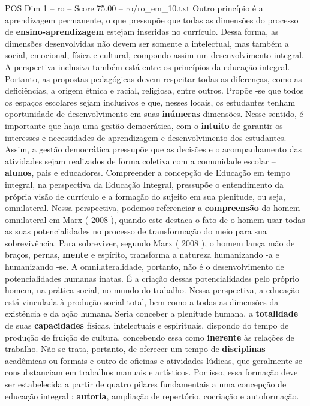 \begin{textsample}{POS Dim 1 – ro – Score 75.00 – ro/ro\_em\_10.txt}
Outro princípio é a aprendizagem permanente, o que pressupõe que todas as dimensões do processo de \textbf{ensino-aprendizagem} estejam inseridas no currículo.
Dessa forma, as dimensões desenvolvidas não devem ser somente a intelectual, mas também a social, emocional, física e cultural, compondo assim um desenvolvimento integral.
A perspectiva inclusiva também está entre os princípios da educação integral.
Portanto, as propostas pedagógicas devem respeitar todas as diferenças, como as deficiências, a origem étnica e racial, religiosa, entre outros.
Propõe -se que todos os espaços escolares sejam inclusivos e que, nesses locais, os estudantes tenham oportunidade de desenvolvimento em suas \textbf{inúmeras} dimensões.
Nesse sentido, é importante que haja uma gestão democrática, com o \textbf{intuito} de garantir os interesses e necessidades de aprendizagem e desenvolvimento dos estudantes.
Assim, a gestão democrática pressupõe que as decisões e o acompanhamento das atividades sejam realizados de forma coletiva com a comunidade escolar – \textbf{alunos}, pais e educadores.
Compreender a concepção de Educação em tempo integral, na perspectiva da Educação Integral, pressupõe o entendimento da própria visão de currículo e a formação do sujeito em sua plenitude, ou seja, omnilateral.
Nessa perspectiva, podemos referenciar a \textbf{compreensão} do homem omnilateral em Marx ( 2008 ), quando este destaca o fato de o homem usar todas as suas potencialidades no processo de transformação do meio para sua sobrevivência.
Para sobreviver, segundo Marx ( 2008 ), o homem lança mão de braços, pernas, \textbf{mente} e espírito, transforma a natureza humanizando -a e humanizando -se.
A omnilateralidade, portanto, não é o desenvolvimento de potencialidades humanas inatas.
É a criação dessas potencialidades pelo próprio homem, na prática social, no mundo do trabalho.
Nessa perspectiva, a educação está vinculada à produção social total, bem como a todas as dimensões da existência e da ação humana.
Seria conceber a plenitude humana, a \textbf{totalidade} de suas \textbf{capacidades} físicas, intelectuais e espirituais, dispondo do tempo de produção de fruição de cultura, concebendo essa como \textbf{inerente} às relações de trabalho.
Não se trata, portanto, de oferecer um tempo de \textbf{disciplinas} acadêmicas ou formais e outro de oficinas e atividades lúdicas, que geralmente se consubstanciam em trabalhos manuais e artísticos.
Por isso, essa formação deve ser estabelecida a partir de quatro pilares fundamentais a uma concepção de educação integral : \textbf{autoria}, ampliação de repertório, cocriação e autoformação.

\end{textsample}
